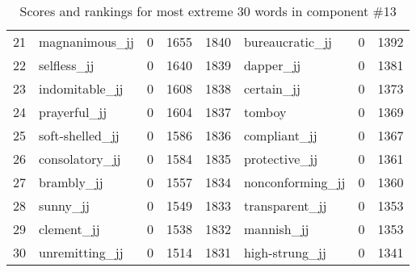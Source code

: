 \begin{table}[tbp]
\begin{tabular}{| rlr@{.}l | rlr@{.}l |}
    21 & magnanimous\_jj & 0 & 1655    &    1840 & bureaucratic\_jj & 0 & 1392 \\
    22 & selfless\_jj & 0 & 1640    &    1839 & dapper\_jj & 0 & 1381 \\
    23 & indomitable\_jj & 0 & 1608    &    1838 & certain\_jj & 0 & 1373 \\
    24 & prayerful\_jj & 0 & 1604    &    1837 & tomboy & 0 & 1369 \\
    25 & soft-shelled\_jj & 0 & 1586    &    1836 & compliant\_jj & 0 & 1367 \\
    26 & consolatory\_jj & 0 & 1584    &    1835 & protective\_jj & 0 & 1361 \\
    27 & brambly\_jj & 0 & 1557    &    1834 & nonconforming\_jj & 0 & 1360 \\
    28 & sunny\_jj & 0 & 1549    &    1833 & transparent\_jj & 0 & 1353 \\
    29 & clement\_jj & 0 & 1538    &    1832 & mannish\_jj & 0 & 1353 \\
    30 & unremitting\_jj & 0 & 1514    &    1831 & high-strung\_jj & 0 & 1341 \\
    \hline
    \end{tabular}
    \caption{Scores and rankings for most extreme 30 words in component \#13} 
\end{table}
\clearpage
